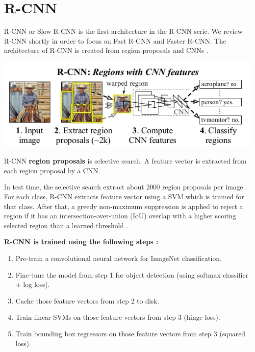 \documentclass{article}
\begin{document}
\section{R-CNN}

R-CNN or Slow R-CNN is the first architecture in the R-CNN serie. We review R-CNN shortly in order to focus on Fast R-CNN and Faster R-CNN. The architecture of R-CNN is created from region proposals and CNNs \cite{arxiv/rcnn}.

\begin{center}
	\includegraphics[scale=0.5]{rcnn}
\end{center}

R-CNN \textbf{region proposals} is selective search. A feature vector is extracted from each region proposal by a CNN. 

In test time, the selective search extract about 2000 region proposals per image. For each class, R-CNN extracts feature vector using a SVM which is trained for that class. After that, a greedy non-maximum suppression is applied to reject a region if it has an intersection-over-union (IoU) overlap with a higher scoring selected region than a learned threshold \cite{arxiv/rcnn}.

\noindent \textbf{R-CNN is trained using the following steps \cite{slides/rcnn-serie}:}
\begin{enumerate}
	\item Pre-train a convolutional neural network for ImageNet classification.
	\item Fine-tune the model from step 1 for object detection (using softmax classifier + log loss).
	\item Cache those feature vectors from step 2 to disk.
	\item Train linear SVMs on those feature vectors from step 3 (hinge loss).
	\item Train bounding box regressors on those feature vectors from step 3 (squared loss).
\end{enumerate}
\end{document}
